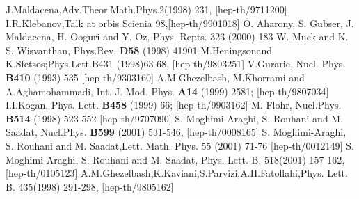 \documentclass[a4paper,12pt]{article}
\begin{document}
\begin{thebibliography}{99}
  J.Maldacena,Adv.Theor.Math.Phys.2(1998) 231,  [hep-th/9711200]
 I.R.Klebanov,Talk at orbis Scienia
98,[hep-th/9901018]
  O. Aharony, S. Gubser, J. Maldacena, H. Ooguri and Y. Oz,
Phys. Repts. 323 (2000) 183
 W. Muck and K. S. Wisvanthan, Phys.Rev. \textbf{D58} (1998) 41901
 M.Heningsonand K.Sfetsos;Phys.Lett.B431
(1998)63-68, [hep-th/9803251]
  V.Gurarie, Nucl. Phys.
\textbf{B410} (1993) 535 [hep-th/9303160]
 A.M.Ghezelbash, M.Khorrami and A.Aghamohammadi,
 Int. J. Mod. Phys. \textbf{A14} (1999) 2581;  [hep-th/9807034]
  I.I.Kogan,
 Phys. Lett. \textbf{B458} (1999) 66;  [hep-th/9903162]
  M. Flohr, Nucl.Phys. \textbf{B514} (1998) 523-552 [hep-th/9707090]
 S. Moghimi-Araghi, S. Rouhani and M. Saadat, Nucl.Phys.
\textbf{B599} (2001) 531-546, [hep-th/0008165]
  S. Moghimi-Araghi, S. Rouhani and M.
Saadat,Lett. Math. Phys. 55 (2001) 71-76 [hep-th/0012149]
  S. Moghimi-Araghi, S. Rouhani and M. Saadat,
Phys. Lett. B. 518(2001) 157-162, [hep-th/0105123]
  A.M.Ghezelbash,K.Kaviani,S.Parvizi,A.H.Fatollahi,Phys. Lett. B. 435(1998) 291-298,
 [hep-th/9805162]

\end{thebibliography}
\end{document}
